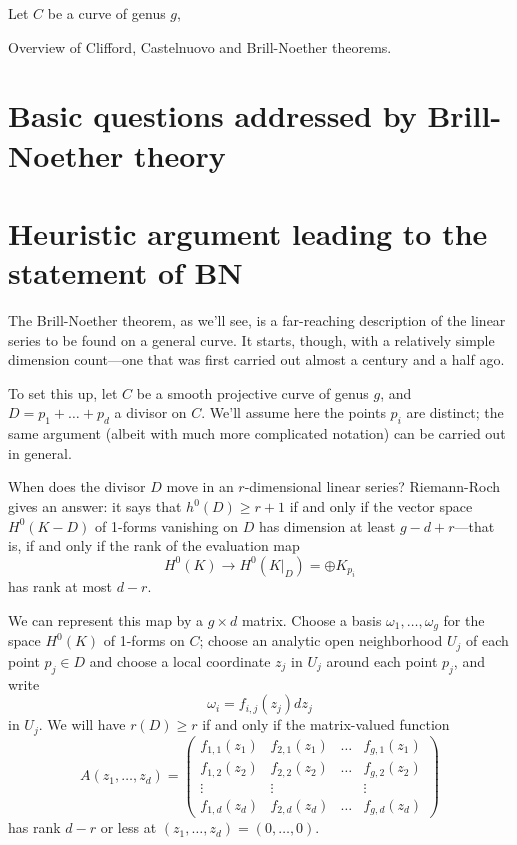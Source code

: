 \begin{theorem}
Let $C$ be a curve of genus $g$, 
\end{theorem}

Overview of Clifford, Castelnuovo and Brill-Noether theorems.

\section{Basic questions addressed by Brill-Noether theory}

\section{Heuristic argument leading to the statement of BN}

The Brill-Noether theorem, as we'll see, is a far-reaching description of the linear series to be found on a general curve. It starts, though, with a relatively simple dimension count---one that was first carried out almost a century and a half ago.

To set this up, let $C$ be a smooth projective curve of genus $g$, and $D = p_1 + \dots + p_d$ a divisor on $C$. We'll assume here the points $p_i$ are distinct; the same argument (albeit with much more complicated notation) can be carried out in general.

When does the divisor $D$ move in an $r$-dimensional linear series? Riemann-Roch gives an answer: it says that $h^0(D) \geq r+1$ if and only if the vector space $H^0(K-D)$ of 1-forms vanishing on $D$ has dimension at least $g-d+r$---that is, if and only if the rank of the evaluation map
$$
H^0(K) \to H^0(K|_D) = \oplus K_{p_i}
$$
has rank at most $d-r$. 

We can represent this map by a $g \times d$ matrix. Choose a basis $\omega_1,\dots,\omega_g$ for the space $H^0(K)$ of 1-forms on $C$; choose an analytic open neighborhood $U_j$ of each point $p_j \in D$ and choose a local coordinate $z_j$ in $U_j$ around each point $p_j$, and write
$$
\omega_i = f_{i,j}(z_j)dz_j
$$
in $U_j$. We will have $r(D) \geq r$ if and only if the  matrix-valued function
$$
A(z_1,\dots,z_d) = 
\begin{pmatrix}
f_{1,1}(z_1) & f_{2,1}(z_1) & \dots & f_{g,1}(z_1) \\
f_{1,2}(z_2) & f_{2,2}(z_2) & \dots & f_{g,2}(z_2) \\
\vdots & \vdots &  & \vdots \\
f_{1,d}(z_d) & f_{2,d}(z_d) & \dots & f_{g,d} (z_d)
\end{pmatrix}
$$
has rank $d-r$ or less at $(z_1,\dots,z_d) = (0,\dots,0)$.

